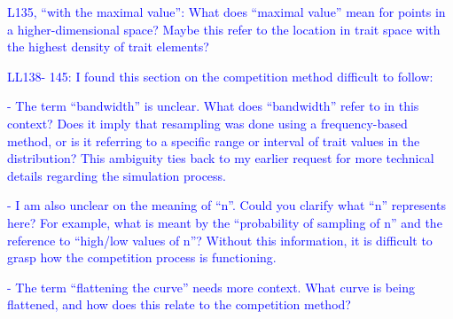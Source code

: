 \documentclass[
]{article}
\begin{document}
\textcolor{blue}{L135, ``with the maximal value'': What does ``maximal value'' mean for points in a higher-dimensional space? Maybe this refer to the location in trait space with the highest density of trait elements?}

\textcolor{blue}{LL138- 145: I found this section on the competition method difficult to follow:}

\textcolor{blue}{- The term ``bandwidth'' is unclear.
What does ``bandwidth'' refer to in this context? Does it imply that resampling was done using a frequency-based method, or is it referring to a specific range or interval of trait values in the distribution? This ambiguity ties back to my earlier request for more technical details regarding the simulation process.}

\textcolor{blue}{- I am also unclear on the meaning of ``n''.
Could you clarify what ``n'' represents here? For example, what is meant by the ``probability of sampling of n'' and the reference to ``high/low values of n''? Without this information, it is difficult to grasp how the competition process is functioning.}

\textcolor{blue}{- The term ``flattening the curve'' needs more context.
What curve is being flattened, and how does this relate to the competition method?}
\end{document}
